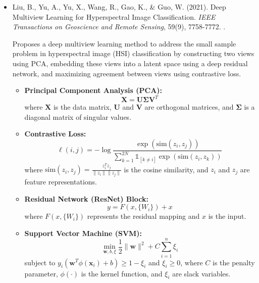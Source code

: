 \documentclass[10pt,svgnames,fragile]{beamer}
\begin{document}
\begin{frame}
\tiny
\begin{itemize}

    \item Liu, B., Yu, A., Yu, X., Wang, R., Gao, K., \& Guo, W. (2021). Deep Multiview Learning for Hyperspectral Image Classification. \textit{IEEE Transactions on Geoscience and Remote Sensing}, 59(9), 7758-7772. \href{https://doi.org/10.1109/TGRS.2020.3034133}{\color{blue}{DOI: 10.1109/TGRS.2020.3034133}}. \cite{liuDeepMultiviewLearning2021}

     {\color{gray}Proposes a deep multiview learning method to address the small sample problem in hyperspectral image (HSI) classification by constructing two views using PCA, embedding these views into a latent space using a deep residual network, and maximizing agreement between views using contrastive loss.}
     \begin{itemize} \tiny
     \item \textbf{Principal Component Analysis (PCA):}
    \[
    \mathbf{X} = \mathbf{U} \mathbf{\Sigma} \mathbf{V}^T
    \]
    where \( \mathbf{X} \) is the data matrix, \( \mathbf{U} \) and \( \mathbf{V} \) are orthogonal matrices, and \( \mathbf{\Sigma} \) is a diagonal matrix of singular values.

    \item \textbf{Contrastive Loss:}
    \[
    \ell(i, j) = - \log \frac{\exp(\text{sim}(z_i, z_j))}{\sum_{k=1}^{2N} \mathbb{1}_{[k \neq i]} \exp(\text{sim}(z_i, z_k))}
    \]
    where \(\text{sim}(z_i, z_j) = \frac{z_i^T z_j}{\|z_i\| \|z_j\|}\) is the cosine similarity, and \( z_i \) and \( z_j \) are feature representations.

    \item \textbf{Residual Network (ResNet) Block:}
    \[
    y = F(x, \{W_i\}) + x
    \]
    where \( F(x, \{W_i\}) \) represents the residual mapping and \( x \) is the input.

    \item \textbf{Support Vector Machine (SVM):}
    \[
    \min_{\mathbf{w}, b, \xi} \frac{1}{2} \|\mathbf{w}\|^2 + C \sum_{i=1}^n \xi_i
    \]
    subject to \( y_i (\mathbf{w}^T \phi(\mathbf{x}_i) + b) \geq 1 - \xi_i \) and \( \xi_i \geq 0 \), where \( C \) is the penalty parameter, \( \phi(\cdot) \) is the kernel function, and \( \xi_i \) are slack variables.
\end{itemize}
     
\end{itemize}
\end{frame}
\end{document}
